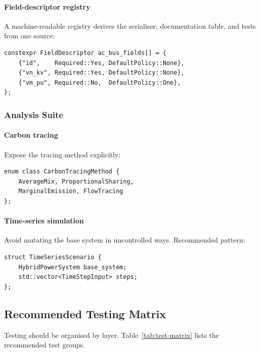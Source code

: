 \paragraph{Field-descriptor registry}
\label{sec:field-registry}

A machine-readable registry derives the serialiser, documentation table, and
tests from one source:
\begin{verbatim}
constexpr FieldDescriptor ac_bus_fields[] = {
    {"id",    Required::Yes, DefaultPolicy::None},
    {"vn_kv", Required::Yes, DefaultPolicy::None},
    {"vm_pu", Required::No,  DefaultPolicy::One},
};
\end{verbatim}

\subsubsection{Analysis Suite}

\paragraph{Carbon tracing}
Expose the tracing method explicitly:
\begin{verbatim}
enum class CarbonTracingMethod {
    AverageMix, ProportionalSharing,
    MarginalEmission, FlowTracing
};
\end{verbatim}

\paragraph{Time-series simulation}
Avoid mutating the base system in uncontrolled ways.  Recommended pattern:
\begin{verbatim}
struct TimeSeriesScenario {
    HybridPowerSystem base_system;
    std::vector<TimeStepInput> steps;
};
\end{verbatim}

\subsection{Recommended Testing Matrix}
\label{sec:test-matrix}

Testing should be organised by layer.
Table~\ref{tab:test-matrix} lists the recommended test groups.

